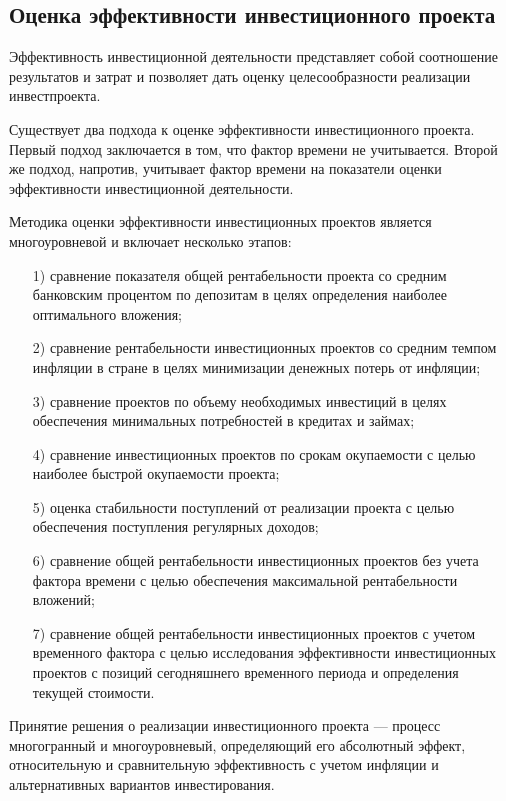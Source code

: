 \subsection{Оценка эффективности инвестиционного проекта}


Эффективность инвестиционной деятельности представляет собой соотношение результатов и затрат и позволяет дать оценку целесообразности реализации инвестпроекта.

Существует два подхода к оценке эффективности инвестиционного проекта. Первый подход заключается в том, что фактор времени не учитывается. Второй же подход, напротив, учитывает фактор времени на показатели оценки эффективности инвестиционной деятельности.

Методика оценки эффективности инвестиционных проектов является многоуровневой и включает несколько этапов:
\begin{enumerate}
 	\item [1)] сравнение показателя общей рентабельности проекта со средним банковским процентом по депозитам в целях определения наиболее оптимального вложения;
	\item [2)] сравнение рентабельности инвестиционных проектов со средним темпом инфляции в стране в целях минимизации денежных потерь от инфляции;
	\item [3)] сравнение проектов по объему необходимых инвестиций в целях обеспечения минимальных потребностей в кредитах и займах;
	\item [4)] сравнение инвестиционных проектов по срокам окупаемости с целью наиболее быстрой окупаемости проекта;
	\item [5)] оценка стабильности поступлений от реализации проекта с целью обеспечения поступления регулярных доходов;
	\item [6)] сравнение общей рентабельности инвестиционных проектов без учета фактора времени с целью обеспечения максимальной рентабельности вложений;
	\item [7)] сравнение общей рентабельности инвестиционных проектов с учетом временного фактора с целью исследования эффективности инвестиционных проектов с позиций сегодняшнего временного периода и определения текущей стоимости.
\end{enumerate}

Принятие решения о реализации инвестиционного проекта --- процесс многогранный и многоуровневый, определяющий его абсолютный эффект, относительную и сравнительную эффективность с учетом инфляции и альтернативных вариантов инвестирования.

